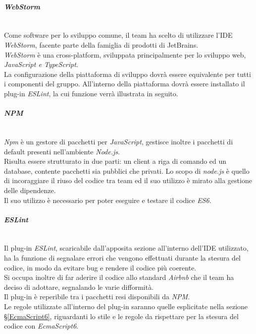 \paragraph{\textit{WebStorm}}\-\\
Come software per lo sviluppo comune, il team ha scelto di utilizzare l'IDE \textit{WebStorm}, facente parte della famiglia di prodotti di JetBrains. \\
\textit{WebStorm} è una cross-platform, sviluppata principalmente per lo sviluppo web, \textit{JavaScript e TypeScript}. \\
La configurazione della piattaforma di sviluppo dovrà essere equivalente per tutti i componenti del gruppo. All'interno della piattaforma dovrà essere installato il plug-in \textit{ESLint}, la cui funzione verrà illustrata in seguito.

\paragraph{\textit{NPM}}\label{NPM} \-\\
\textit{Npm} è un gestore di pacchetti per \textit{JavaScript}, gestisce inoltre i pacchetti di default presenti nell'ambiente \textit{Node.js}\glossario.\\
Risulta essere strutturato in due parti: un client a riga di comando ed un database, contente pacchetti sia pubblici che privati. Lo scopo di \textit{node.js} è quello di incoraggiare il riuso del codice tra team ed il suo utilizzo è mirato alla gestione delle dipendenze.\\ 
Il suo utilizzo è necessario per poter eseguire e testare il codice \textit{ES6}.

\paragraph{\textit{ESLint}}\-\\
Il plug-in \textit{ESLint}, scaricabile dall'apposita sezione all'interno dell'IDE utilizzato, ha la funzione di segnalare errori che vengono effettuati durante la stesura del codice, in modo da evitare bug e rendere il codice più coerente. \\ 
Si occupa inoltre di far aderire il codice allo standard \textit{Airbnb} che il team ha deciso di adottare, segnalando le varie difformità.\\
Il plug-in è reperibile tra i pacchetti resi disponibili da \textit{NPM}.\\
Le regole utilizzate all'interno del plug-in saranno quelle esplicitate nella sezione §\ref{EcmaScript6}, riguardanti lo stile e le regole da rispettare per la stesura del codice con \textit{EcmaScript6}.

